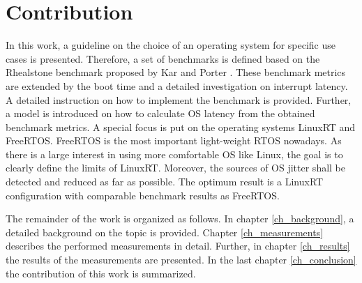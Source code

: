 \section{Contribution}
In this work, a guideline on the choice of an operating system for specific use cases is presented.
Therefore, a set of benchmarks is defined based on the Rhealstone benchmark proposed by Kar and Porter \cite{kar:itrb} \cite{kar:artbp}. 
These benchmark metrics are extended by the boot time and a detailed investigation on interrupt latency.
A detailed instruction on how to implement the benchmark is provided.
Further, a model is introduced on how to calculate OS latency from the obtained benchmark metrics. 
A special focus is put on the operating systems LinuxRT and FreeRTOS. 
FreeRTOS is the most important light-weight \ac{RTOS} nowadays.
As there is a large interest in using more comfortable \ac{OS} like Linux, the goal is to clearly define the limits of LinuxRT.
Moreover, the sources of OS jitter shall be detected and reduced as far as possible. 
The optimum result is a LinuxRT configuration with comparable benchmark results as FreeRTOS. 

\par
The remainder of the work is organized as follows. In chapter \ref{ch_background}, a detailed background on the topic is provided. 
Chapter \ref{ch_measurements} describes the performed measurements in detail. 
Further, in chapter \ref{ch_results} the results of the measurements are presented. 
In the last chapter \ref{ch_conclusion} the contribution of this work is summarized.